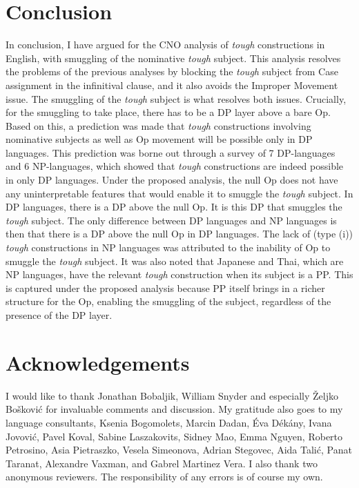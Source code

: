 \documentclass[output=paper,colorlinks,citecolor=brown,
]{langscibook}
\begin{document}
\section{Conclusion} \label{s4ha}
In conclusion, I have argued for the CNO analysis \citep{Hicks2009} of \textit{tough} constructions in English, with smuggling of the nominative \textit{tough} subject. This analysis resolves the problems of the previous analyses by blocking the \textit{tough} subject from Case assignment in the infinitival clause, and it also avoids the Improper Movement issue. The smuggling of the \textit{tough} subject is what resolves both issues. Crucially, for the smuggling to take place, there has to be a DP layer above a bare Op. Based on this, a prediction was made that \textit{tough} constructions involving nominative subjects as well as Op movement will be possible only in DP languages. This prediction was borne out through a survey of 7 DP-languages and 6 NP-languages, which showed that \textit{tough} constructions are indeed possible in only DP languages. Under the proposed analysis, the null Op does not have any uninterpretable features that would enable it to smuggle the \textit{tough} subject. In DP languages, there is a DP above the null Op. It is this DP that smuggles the \textit{tough} subject. The only difference between DP languages and NP languages is then that there is a DP above the null Op in DP languages. The lack of (type (i)) \textit{tough} constructions in NP languages was attributed to the inability of Op to smuggle the \textit{tough} subject. It was also noted that Japanese and Thai, which are NP languages, have the relevant \textit{tough} construction when its subject is a PP. This is captured under the proposed analysis because PP itself brings in a richer structure for the Op, enabling the smuggling of the subject, regardless of the presence of the DP layer. 


\section*{Acknowledgements}
I would like to thank Jonathan Bobaljik, William Snyder and especially Željko Bošković for invaluable comments and discussion. My gratitude also goes to my language consultants, Ksenia Bogomolets, Marcin Dadan, Éva Dékány, Ivana Jovović, Pavel Koval, Sabine Laszakovits, Sidney Mao, Emma Nguyen, Roberto Petrosino, Asia Pietraszko, Vesela Simeonova, Adrian Stegovec, Aida Talić, Panat Taranat, Alexandre Vaxman, and Gabrel Martinez Vera. I also thank two anonymous reviewers. The responsibility of any errors is of course my own.

\printbibliography[heading=subbibliography,notkeyword=this]
\end{document}
